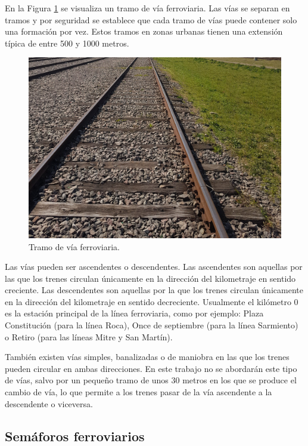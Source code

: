 			En la Figura \ref{fig:Via_eclisa} se visualiza un tramo de vía ferroviaria. Las vías se separan en tramos y por seguridad se establece que cada tramo de vías puede contener solo una formación por vez. Estos tramos en zonas urbanas tienen una extensión típica de entre 500 y 1000 metros.
			
			\begin{figure}[htbp!]
				\centering
				\includegraphics[scale=.12]{./Figures/Tramo_via}
				\caption{Tramo de vía ferroviaria.}
				\label{fig:Via_eclisa}
			\end{figure}					
			
			Las vías pueden ser ascendentes o descendentes. Las ascendentes son aquellas por las que los trenes circulan únicamente en la dirección del kilometraje en sentido creciente. Las descendentes son aquellas por la que los trenes circulan únicamente en la dirección del kilometraje en sentido decreciente\citep{RITO}. Usualmente el kilómetro 0 es la estación principal de la línea ferroviaria, como por ejemplo: Plaza Constitución (para la línea Roca), Once de septiembre (para la línea Sarmiento) o Retiro (para las líneas Mitre y San Martín).
		
			También existen vías simples, banalizadas o de maniobra en las que los trenes pueden circular en ambas direcciones. En este trabajo no se abordarán este tipo de vías, salvo por un pequeño tramo de unos 30 metros en los que se produce el cambio de vía, lo que permite a los trenes pasar de la vía ascendente a la descendente o viceversa.
			
		\subsection{Semáforos ferroviarios}
			
